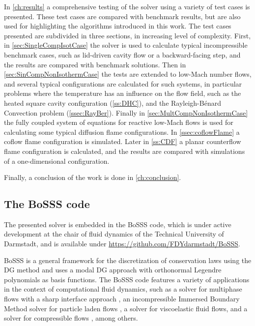 In \cref{ch:results} a comprehensive testing of the solver using a variety of test cases is presented. These test cases are compared with benchmark results, but are also used for highlighting the algorithms introduced in this work. The test cases presented are subdivided in three sections, in increasing level of complexity. First, in \cref{sec:SingleCompIsotCase} the solver is used to calculate typical incompressible benchmark cases, such as lid-driven cavity flow or a backward-facing step, and the results are compared with benchmark solutions. Then in \cref{sec:SinCompNonIsothermCase} the tests are extended to low-Mach number flows, and several typical configurations are calculated for such systems, in particular problems where the temperature has an influence on the flow field, such as the heated square cavity configuration (\cref{ss:DHC}), and the Rayleigh-Bénard Convection problem (\cref{ssec:RayBer}).
Finally in \cref{sec:MultCompNonIsothermCase} the fully coupled system of equations for reactive low-Mach flows is used for calculating some typical diffusion flame configurations. In \cref{ssec:coflowFlame} a coflow flame configuration is simulated. Later in \cref{ss:CDF} a planar counterflow flame configuration is calculated, and the results are compared with simulations of a one-dimensional configuration. 

Finally, a conclusion of the work is done in \cref{ch:conclusion}.

\subsection{The BoSSS code}
The presented solver is embedded in the \gls{BoSSS} code, which is under active development at the chair of fluid dynamics of the Technical University of Darmstadt, and is available under \href{https://github.com/FDYdarmstadt/BoSSS}{https://github.com/FDYdarmstadt/BoSSS}.

BoSSS is a general framework for the discretization of conservation laws using the DG method and uses a modal DG approach with orthonormal Legendre polynomials as basis functions. The BoSSS code features a variety of applications in the context of computational fluid dynamics, such as a solver for multiphase flows with a sharp interface approach \parencite{kummerExtendedDiscontinuousGalerkin2017}, an incompressible Immersed Boundary Method solver for particle laden flows \parencite{krauseIncompressibleImmersedBoundary2017}, a solver for viscoelastic fluid flows\parencite{kikkerFullyCoupledHighorder}, and a solver for compressible flows \parencite{geisenhoferDiscontinuousGalerkinImmersed2019}, among others.


